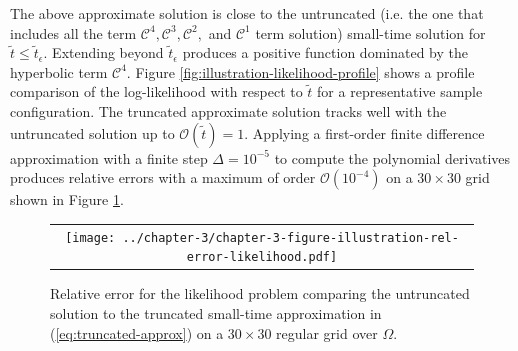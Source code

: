 The above approximate solution is close to the untruncated (i.e. the
one that includes all the term
$\mathcal{C}^4, \mathcal{C}^3, \mathcal{C}^2,$ and $\mathcal{C}^1$
term solution) small-time solution for
$\tilde{t} \leq \tilde{t}_\epsilon$. Extending beyond
$\tilde{t}_\epsilon$ produces a positive function dominated by the
hyperbolic term $\mathcal{C}^4$. Figure
\ref{fig:illustration-likelihood-profile} shows a profile comparison
of the log-likelihood with respect to $\tilde{t}$ for a representative
sample configuration. The truncated approximate solution tracks well
with the untruncated solution up to $\mathcal{O}(\tilde{t}) =
1$. Applying a first-order finite difference approximation with a
finite step $\Delta = 10^{-5}$ to compute the polynomial derivatives
produces relative errors with a maximum of order
$\mathcal{O}(10^{-4})$ on a $30 \times 30$ grid shown in Figure
\ref{fig:illustration-rel-error-likelihood}.
\begin{figure}
  \centering
  \begin{tabular}{c}
    \begin{minipage}{0.90\textwidth}
      \centering
      \texttt{[image: ../chapter-3/chapter-3-figure-illustration-rel-error-likelihood.pdf]}
      \caption{Relative error for the likelihood problem comparing the
        untruncated solution to the truncated small-time approximation in
        (\ref{eq:truncated-approx}) on a $30 \times 30$ regular grid
        over $\Omega$. }
      \label{fig:illustration-rel-error-likelihood}
    \end{minipage}
    \end{tabular}
\end{figure}



